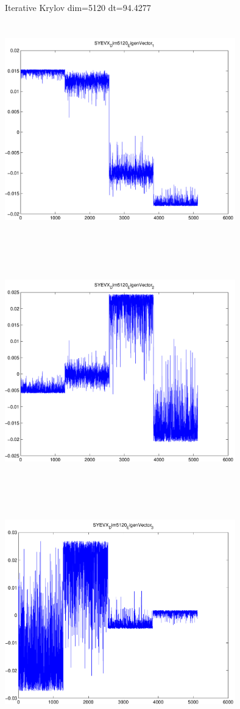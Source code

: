\documentclass[9pt]{article}
\theoremstyle{plain}
\theoremstyle{definition}
\theoremstyle{remark}
\numberwithin{equation}{section}
\begin{document}
Iterative Krylov dim=5120 dt=94.4277
\includegraphics[width=10.0cm,height=10.0cm]{SYEVX_Dim5120_EigenVector_1.pdf}

\includegraphics[width=10.0cm,height=10.0cm]{SYEVX_Dim5120_EigenVector_2.pdf}

\includegraphics[width=10.0cm,height=10.0cm]{SYEVX_Dim5120_EigenVector_3.pdf}
\end{document}
